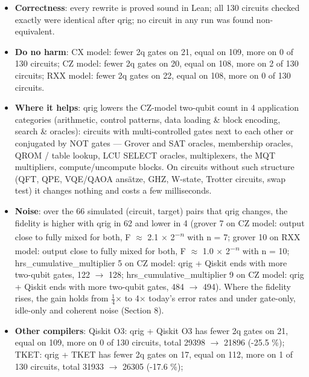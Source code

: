\documentclass[
  10pt,
]{article}
\providecommand{\tightlist}{%
  \setlength{\itemsep}{0pt}\setlength{\parskip}{0pt}}
\begin{document}
\begin{itemize}
\tightlist
\item
  \textbf{Correctness}: every rewrite is proved sound in Lean; all 130
  circuits checked exactly were identical after qrig; no circuit in any
  run was found non-equivalent.
\item
  \textbf{Do no harm}: CX model: fewer 2q gates on 21, equal on 109,
  more on 0 of 130 circuits; CZ model: fewer 2q gates on 20, equal on
  108, more on 2 of 130 circuits; RXX model: fewer 2q gates on 22, equal
  on 108, more on 0 of 130 circuits.
\item
  \textbf{Where it helps}: qrig lowers the CZ-model two-qubit count in 4
  application categories (arithmetic, control patterns, data loading \&
  block encoding, search \& oracles): circuits with multi-controlled
  gates next to each other or conjugated by NOT gates --- Grover and SAT
  oracles, membership oracles, QROM / table lookup, LCU SELECT oracles,
  multiplexers, the MQT multipliers, compute/uncompute blocks. On
  circuits without such structure (QFT, QPE, VQE/QAOA ans\"{a}tze, GHZ,
  W-state, Trotter circuits, swap test) it changes nothing and costs a
  few milliseconds.
\item
  \textbf{Noise}: over the 66 simulated (circuit, target) pairs that
  qrig changes, the fidelity is higher with qrig in 62 and lower in 4
  (grover 7 on CZ model: output close to fully mixed for both, F \ensuremath{\approx} 2.1 \ensuremath{\times}
  2\textsuperscript{\ensuremath{-}}\textsuperscript{\ensuremath{n}} with n = 7; grover 10 on RXX model: output close to fully mixed
  for both, F \ensuremath{\approx} 1.0 \ensuremath{\times} 2\textsuperscript{\ensuremath{-}}\textsuperscript{\ensuremath{n}} with n = 10; hrs\_cumulative\_multiplier 5 on
  CZ model: qrig + Qiskit ends with more two-qubit gates, 122 \ensuremath{\rightarrow} 128;
  hrs\_cumulative\_multiplier 9 on CZ model: qrig + Qiskit ends with
  more two-qubit gates, 484 \ensuremath{\rightarrow} 494). Where the fidelity rises, the gain
  holds from \ensuremath{\tfrac{1}{4}}\ensuremath{\times} to 4\ensuremath{\times} today's error rates and under gate-only, idle-only
  and coherent noise (Section 8).
\item
  \textbf{Other compilers}: Qiskit O3: qrig + Qiskit O3 has fewer 2q
  gates on 21, equal on 109, more on 0 of 130 circuits, total 29398 \ensuremath{\rightarrow}
  21896 (-25.5 \%); TKET: qrig + TKET has fewer 2q gates on 17, equal on
  112, more on 1 of 130 circuits, total 31933 \ensuremath{\rightarrow} 26305 (-17.6 \%);

\end{itemize}
\end{document}
